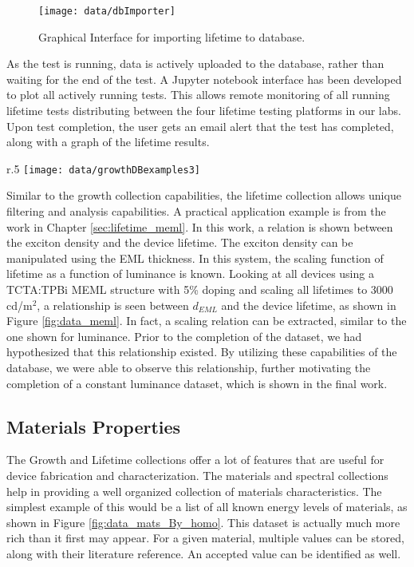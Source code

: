 \documentclass[../thesis.tex]{subfiles}
\begin{document}
\begin{figure}[ht]
\centering
\texttt{[image: data/dbImporter]}
\caption{Graphical Interface for importing lifetime to database.}
\label{fig:dbImporter}
\end{figure}

As the test is running, data is actively uploaded to the database, rather than waiting for the end of the test.
A Jupyter notebook interface has been developed to plot all actively running tests.
This allows remote monitoring of all running lifetime tests distributing between the four lifetime testing platforms in our labs.
Upon test completion, the user gets an email alert that the test has completed, along with a graph of the lifetime results.


\begin{wrapfigure}{r}{.5\textwidth}
\centering
\texttt{[image: data/growthDBexamples3]}
\caption{Device lifetime for a particular set of devices as a function of EML thickness. All lifetimes scaled to 3000 cd/m$^2$, with scaled lifetimes shown in red.}
\label{fig:data_meml}
\end{wrapfigure}

Similar to the growth collection capabilities, the lifetime collection allows unique filtering and analysis capabilities.
A practical application example is from the work in Chapter \ref{sec:lifetime_meml}.
In this work, a relation is shown between the exciton density and the device lifetime.
The exciton density can be manipulated using the EML thickness.
In this system, the scaling function of lifetime as a function of luminance is known.  
Looking at all devices using a TCTA:TPBi MEML structure with 5\% doping and scaling all lifetimes to 3000 cd/m$^2$, a relationship is seen between $d_{EML}$ and the device lifetime, as shown in Figure \ref{fig:data_meml}.
In fact, a scaling relation can be extracted, similar to the one shown for luminance.
Prior to the completion of the dataset, we had hypothesized that this relationship existed.  
By utilizing these capabilities of the database, we were able to observe this relationship, further motivating the completion of a constant luminance dataset, which is shown in the final work.


\subsection{Materials Properties}

The Growth and Lifetime collections offer a lot of features that are useful for device fabrication and characterization.
The materials and spectral collections help in providing a well organized collection of materials characteristics.
The simplest example of this would be a list of all known energy levels of materials, as shown in Figure \ref{fig:data_mats_By_homo}.
This dataset is actually much more rich than it first may appear.  
For a given material, multiple values can be stored, along with their literature reference.
An accepted value can be identified as well.
\end{document}
